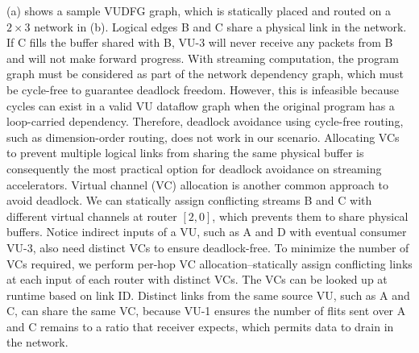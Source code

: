 (a) shows a sample VUDFG graph, which is statically placed and routed on a $2\times3$ network in (b). 
Logical edges B and C share a physical link in the network. If C fills the buffer shared with B, VU-3 will never receive any packets from B and will not make forward progress.
  With streaming computation, the program graph must be considered as part of the network dependency graph, which must be cycle-free to guarantee deadlock freedom. However, this is infeasible because cycles can exist in a valid VU dataflow graph when the original program has a loop-carried dependency. Therefore, deadlock avoidance using cycle-free routing, such as dimension-order routing, does not work in our scenario. 
Allocating VCs to prevent multiple logical links from sharing the same physical buffer is consequently the most practical option for deadlock avoidance on streaming accelerators.
Virtual channel (VC) allocation is another common approach to avoid deadlock. We can statically assign conflicting streams B and C with different
virtual channels at router $[2,0]$, which prevents them to share physical buffers. 
Notice indirect inputs of a VU, such as A and D with eventual consumer VU-3,
also need distinct VCs to ensure deadlock-free. To minimize the number of VCs required, we perform per-hop VC allocation--statically
assign conflicting links at each input of each router with distinct VCs. The VCs can be looked up at runtime based on link ID.
Distinct links from the same source VU, such as A and C, can share the same VC, because VU-1 ensures the number of flits sent over A and C remains
to a ratio that receiver expects, which permits data to drain in the network.
\fi

